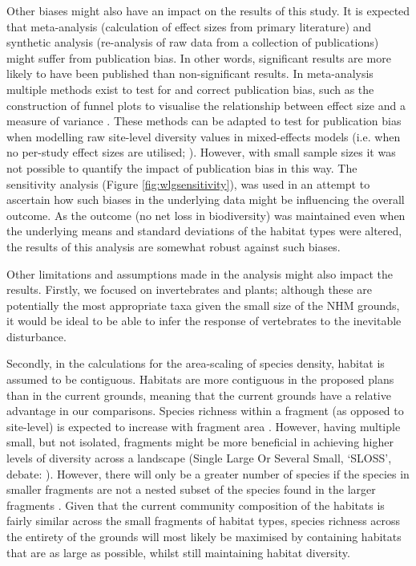 Other biases might also have an impact on the results of this study. It is expected that meta-analysis (calculation of effect sizes from primary literature) and synthetic analysis (re-analysis of raw data from a collection of publications) might suffer from publication bias. In other words, significant results are more likely to have been published than non-significant results. In meta-analysis multiple methods exist to test for and correct publication bias, such as the construction of funnel plots to visualise the relationship between effect size and a measure of variance \citep{Koricheva:2013metaanalysis}. These methods can be adapted to test for publication bias when modelling raw site-level diversity values in mixed-effects models (i.e. when no per-study effect sizes are utilised; \citealt{Newbold:2015nat}). However, with small sample sizes it was not possible to quantify the impact of publication bias in this way. The sensitivity analysis (Figure \ref{fig:wlgsensitivity}), was used in an attempt to ascertain how such biases in the underlying data might be influencing the overall outcome. As the outcome (no net loss in biodiversity) was maintained even when the underlying means and standard deviations of the habitat types were altered, the results of this analysis are somewhat robust against such biases.


Other limitations and assumptions made in the analysis might also impact the results. Firstly, we focused on invertebrates and plants; although these are potentially the most appropriate taxa given the small size of the NHM grounds, it would be ideal to be able to infer the response of vertebrates to the inevitable disturbance.


Secondly, in the calculations for the area-scaling of species density, habitat is assumed to be contiguous. Habitats are more contiguous in the proposed plans than in the current grounds, meaning that the current grounds have a relative advantage in our comparisons. Species richness within a fragment (as opposed to site-level) is expected to increase with fragment area \citep{Godefroid:2003geb,Nielsen:2014ue}. However, having multiple small, but not isolated, fragments might be more beneficial in achieving higher levels of diversity across a landscape (Single Large Or Several Small, `SLOSS', debate: \citealt{Diamond:1975bc,Simberloff:1976sci}). However, there will only be a greater number of species if the species in smaller fragments are not a nested subset of the species found in the larger fragments \citep{Simberloff:1976sci,Tscharntke:2002ea}. Given that the current community composition of the habitats is fairly similar across the small fragments of habitat types, species richness across the entirety of the grounds will most likely be maximised by containing habitats that are as large as possible, whilst still maintaining habitat diversity. 

